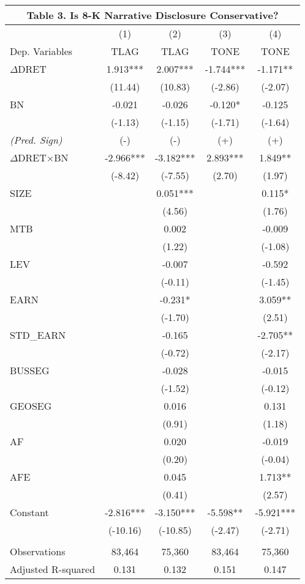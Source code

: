 \begin{table}[H] \label{T3}
	\begin{center}
		\tabcolsep=0.11cm
		\begin{tabular}{lcccc}
			\multicolumn{5}{c}{\textbf{Table 3. Is 8-K Narrative Disclosure Conservative?}} \\
			\toprule
			\toprule
			& (1) & (2) & (3) & (4) \\
			Dep. Variables & TLAG & TLAG & TONE & TONE \\
			\midrule
			$\Delta$DRET & 1.913*** & 2.007*** & -1.744*** & -1.171** \\
			& (11.44) & (10.83) & (-2.86) & (-2.07) \\
			BN & -0.021 & -0.026 & -0.120* & -0.125 \\
			& (-1.13) & (-1.15) & (-1.71) & (-1.64) \\
			\rowcolor[rgb]{ .906,  .902,  .902} \textit{(Pred. Sign)} & (-) & (-) & (+) & (+) \\
			\rowcolor[rgb]{ .906,  .902,  .902} $\Delta$DRET$\times$BN & -2.966*** & -3.182*** & 2.893*** & 1.849** \\
			\rowcolor[rgb]{ .906,  .902,  .902}   & (-8.42) & (-7.55) & (2.70) & (1.97) \\
			SIZE &   & 0.051*** &   & 0.115* \\
			&   & (4.56) &   & (1.76) \\
			MTB &   & 0.002 &   & -0.009 \\
			&   & (1.22) &   & (-1.08) \\
			LEV &   & -0.007 &   & -0.592 \\
			&   & (-0.11) &   & (-1.45) \\
			EARN &   & -0.231* &   & 3.059** \\
			&   & (-1.70) &   & (2.51) \\
			STD\_EARN &   & -0.165 &   & -2.705**\\
			&   & (-0.72) &   & (-2.17)\\
			BUSSEG &   & -0.028 &   & -0.015 \\
			&   & (-1.52) &   & (-0.12) \\
			GEOSEG &   & 0.016 &   & 0.131 \\
			&   & (0.91) &   & (1.18) \\
			AF &   & 0.020 &   & -0.019 \\
			&   & (0.20) &   & (-0.04)\\
			AFE &   & 0.045 &   & 1.713**  \\
			&   & (0.41) &   & (2.57) \\
			Constant & -2.816*** & -3.150*** & -5.598** & -5.921*** \\
			& (-10.16) & (-10.85) & (-2.47) & (-2.71) \\
			&   &   &   &  \\
			Observations & 83,464 & 75,360 & 83,464 & 75,360 \\
			Adjusted R-squared & 0.131 & 0.132 & 0.151 & 0.147 \\
			\bottomrule
			\bottomrule
		\end{tabular}%
	\end{center}
\end{table}%